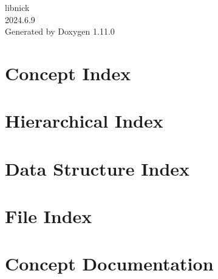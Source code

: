 \documentclass[twoside]{book}
\newcommand{\+}{\discretionary{\mbox{\scriptsize$\hookleftarrow$}}{}{}}
\newcommand{\clearemptydoublepage}{%
    \newpage{\pagestyle{empty}\cleardoublepage}%
  }
\begin{document}
  \raggedbottom
    \hypersetup{pageanchor=false,
                bookmarksnumbered=true,
                pdfencoding=unicode
               }
  \begin{titlepage}
  \vspace*{7cm}
  \begin{center}%
  {\Large libnick}\\
  [1ex]\large 2024.\+6.\+9 \\
  \vspace*{1cm}
  {\large Generated by Doxygen 1.11.0}\\
  \end{center}
  \end{titlepage}
  \clearemptydoublepage
  \tableofcontents
  \clearemptydoublepage
  \hypersetup{pageanchor=true}






\chapter{Concept Index}

\chapter{Hierarchical Index}

\chapter{Data Structure Index}

\chapter{File Index}

\chapter{Concept Documentation}



\end{document}
